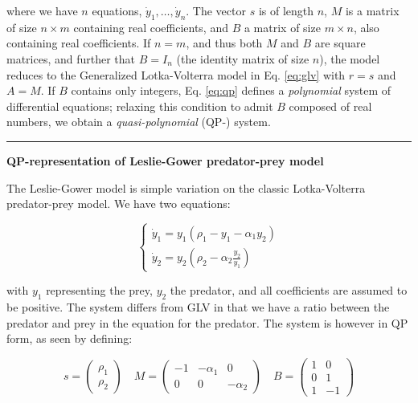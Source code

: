 \documentclass{article}
\begin{document}
where we have \(n\) equations, \(\dot{y}_1, \ldots, \dot{y}_n\). The
vector \(s\) is of length \(n\), \(M\) is a matrix of size
\(n \times m\) containing real coefficients, and \(B\) a matrix of size
\(m \times n\), also containing real coefficients. If \(n = m\), and
thus both \(M\) and \(B\) are square matrices, and further that
\(B=I_n\) (the identity matrix of size \(n\)), the model reduces to the
Generalized Lotka-Volterra model in Eq. \ref{eq:glv} with \(r = s\) and
\(A = M\). If \(B\) contains only integers, Eq. \ref{eq:qp} defines a
\emph{polynomial} system of differential equations; relaxing this
condition to admit \(B\) composed of real numbers, we obtain a
\emph{quasi-polynomial} (QP-) system.

\begin{center}\rule{0.5\linewidth}{0.5pt}\end{center}

\textbf{QP-representation of Leslie-Gower predator-prey model}

The Leslie-Gower model is simple variation on the classic Lotka-Volterra
predator-prey model. We have two equations:

\begin{equation}
\label{eq:lg}
\begin{cases}
\dot{y}_1 = y_1 (\rho_1 - y_1- \alpha_1 y_2)\\
\dot{y}_2 = y_2 \left(\rho_2 - \alpha_2 \frac{y_2}{y_1} \right)
\end{cases}
\end{equation}

with \(y_1\) representing the prey, \(y_2\) the predator, and all
coefficients are assumed to be positive. The system differs from GLV in
that we have a ratio between the predator and prey in the equation for
the predator. The system is however in QP form, as seen by defining:

\begin{equation}
\label{eq:lgqp}
s = \begin{pmatrix}
\rho_1\\
\rho_2
\end{pmatrix} \quad 
M = \begin{pmatrix}
-1 & -\alpha_1 & 0\\
0 & 0 & -\alpha_2
\end{pmatrix} \quad
B = \begin{pmatrix}
1 & 0 \\
0 & 1 \\
1 & -1
\end{pmatrix}
\end{equation}
\end{document}
